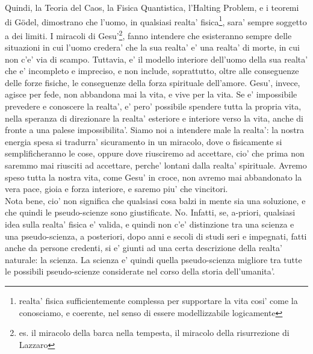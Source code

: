 Quindi, la Teoria del Caos, la Fisica Quantistica, l'Halting Problem, e i teoremi di Gödel, dimostrano che l'uomo, in qualsiasi realta' fisica\footnote{realta' fisica sufficientemente complessa per supportare la vita cosi' come la conosciamo, e coerente, nel senso di essere modellizzabile logicamente}, sara' sempre soggetto a dei limiti. I miracoli di Gesu'\footnote{es. il miracolo della barca nella tempesta, il miracolo della risurrezione di Lazzaro}, fanno intendere che esisteranno sempre delle situazioni in cui l'uomo credera' che la sua realta' e' una realta' di morte, in cui non c'e' via di scampo. Tuttavia, e' il modello interiore dell'uomo della sua realta' che e' incompleto e impreciso, e non include, soprattutto, oltre alle conseguenze delle forze fisiche, le conseguenze della forza spirituale dell'amore. Gesu', invece, agisce per fede, non abbandona mai la vita, e vive per la vita. Se e' impossibile prevedere e conoscere la realta', e' pero' possibile spendere tutta la propria vita, nella speranza di direzionare la realta' esteriore e interiore verso la vita, anche di fronte a una palese impossibilita'. Siamo noi a intendere male la realta': la nostra energia spesa si tradurra' sicuramento in un miracolo, dove o fisicamente si semplificheranno le cose, oppure dove riusciremo ad accettare, cio' che prima non saremmo mai riusciti ad accettare, perche' lontani dalla realta' spirituale. 
Avremo speso tutta la nostra vita, come Gesu' in croce, non avremo mai abbandonato la vera pace, gioia e forza interiore, e saremo piu' che vincitori.\\
Nota bene, cio' non significa che qualsiasi cosa balzi in mente sia una soluzione, e che quindi le pseudo-scienze sono giustificate. No. Infatti, se, a-priori, qualsiasi idea sulla realta' fisica e' valida, e quindi non c'e' distinzione tra una scienza e una pseudo-scienza, a posteriori, dopo anni e secoli di studi seri e impegnati, fatti anche da persone credenti, si e' giunti ad una certa descrizione della realta' naturale: la scienza. La scienza e' quindi quella pseudo-scienza migliore tra tutte le possibili pseudo-scienze considerate nel corso della storia dell'umanita'.\\
